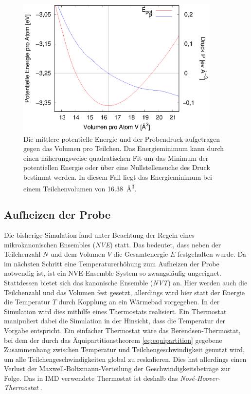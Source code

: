 		\begin{figure}[!ht]
			\centering
			\includegraphics[width=0.9\textwidth]{chapter/main/single/plt/equilibration/homdef.eps}
			\caption{Die mittlere potentielle Energie und der Probendruck aufgetragen gegen das
			Volumen pro Teilchen. Das Energieminimum kann durch einen näherungsweise quadratischen
			Fit um das Minimum der potentiellen Energie oder über eine Nullstellensuche des Druck
			bestimmt werden. In diesem Fall liegt das Energieminimum bei einem Teilchenvolumen von
			\SI{16.38}{\angstrom\cubed}.}
			\label{fig:homdef}
		\end{figure}

	\subsection{Aufheizen der Probe}
		Die bisherige Simulation fand unter Beachtung der Regeln eines mikrokanonischen Ensembles
		(\emph{NVE}) statt. Das bedeutet, dass neben der Teilchenzahl $N$ und dem Volumen $V$ die
		Gesamtenergie $E$ festgehalten wurde. Da im nächsten Schritt eine Temperaturerhöhung zum
		Aufheizen der Probe notwendig ist, ist ein NVE-Ensemble System so zwangsläufig ungeeignet.
		Stattdessen bietet sich das kanonische Ensemble (\emph{NVT}) an. Hier werden auch die
		Teilchenzahl und das Volumen fest gesetzt, allerdings wird hier statt der Energie die
		Temperatur $T$ durch Kopplung an ein Wärmebad vorgegeben. In der Simulation wird dies
		mithilfe eines Thermostats realisiert. Ein Thermostat manipuliert dabei die Simulation in
		der Hinsicht, dass die Temperatur der Vorgabe entspricht. Ein einfacher Thermostat wäre
		das Berendsen-Thermostat, bei dem der durch das Äquipartitionstheorem
		\eqref{eq:equipartition} gegebene Zusammenhang zwischen Temperatur und
		Teilchengeschwindigkeit genutzt wird, um alle Teilchengeschwindigkeiten global zu
		reskalieren. Dies hat allerdings einen Verlust der Maxwell-Boltzmann-Verteilung der
		Geschwindigkeitsbeträge zur Folge. Das in IMD verwendete Thermostat ist deshalb das
		\emph{Nosé-Hoover-Thermostat} \cite{rapp2014laserablation}.

